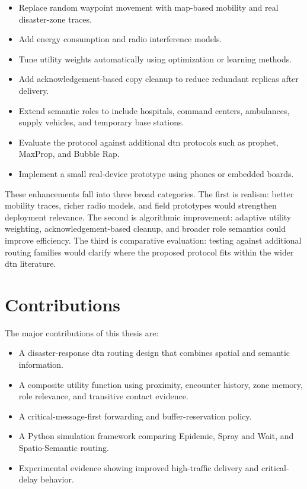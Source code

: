 \begin{itemize}
	\item Replace random waypoint movement with map-based mobility and real disaster-zone traces.
	\item Add energy consumption and radio interference models.
	\item Tune utility weights automatically using optimization or learning methods.
	\item Add acknowledgement-based copy cleanup to reduce redundant replicas after delivery.
	\item Extend semantic roles to include hospitals, command centers, ambulances, supply vehicles, and temporary base stations.
	\item Evaluate the protocol against additional \ac{dtn} protocols such as \ac{prophet}, MaxProp, and Bubble Rap.
	\item Implement a small real-device prototype using phones or embedded boards.
\end{itemize}

These enhancements fall into three broad categories. The first is realism: better mobility traces, richer radio models, and field prototypes would strengthen deployment relevance. The second is algorithmic improvement: adaptive utility weighting, acknowledgement-based cleanup, and broader role semantics could improve efficiency. The third is comparative evaluation: testing against additional routing families would clarify where the proposed protocol fits within the wider \ac{dtn} literature.

\section*{Contributions}
The major contributions of this thesis are:

\begin{itemize}
	\item A disaster-response \ac{dtn} routing design that combines spatial and semantic information.
	\item A composite utility function using proximity, encounter history, zone memory, role relevance, and transitive contact evidence.
	\item A critical-message-first forwarding and buffer-reservation policy.
	\item A Python simulation framework comparing Epidemic, Spray and Wait, and Spatio-Semantic routing.
	\item Experimental evidence showing improved high-traffic delivery and critical-delay behavior.
\end{itemize}

